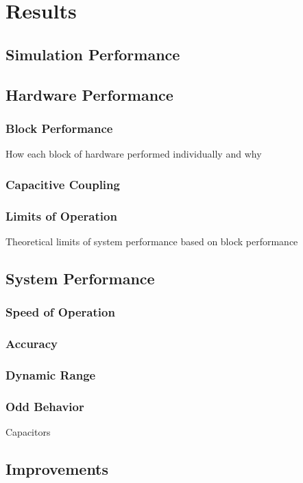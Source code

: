 \documentclass[11pt,twoside]{mitthesis}
\begin{document}
\fi

\chapter{Results}

\section{Simulation Performance}

\section{Hardware Performance}
\subsection{Block Performance}
How each block of hardware performed individually and why
\subsection{Capacitive Coupling}
\subsection{Limits of Operation}
Theoretical limits of system performance based on block performance

\section{System Performance}
\subsection{Speed of Operation}
\subsection{Accuracy}
\subsection{Dynamic Range}
\subsection{Odd Behavior}
Capacitors

\section{Improvements}
\end{document}
